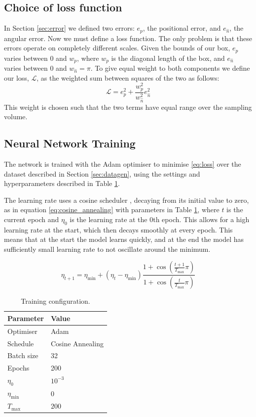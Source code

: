 \subsection{Choice of loss function}\label{sec:methods-loss}
In Section \ref{sec:error} we defined two errors: $e_p$, the positional error, and $e_{\hat{n}}$, the angular error. Now we must define a loss function. The only problem is that these errors operate on completely different scales. Given the bounds of our box, $e_p$ varies between $0$ and $w_p$, where $w_p$ is the diagonal length of the box, and $e_{\hat{n}}$ varies between $0$ and $w_{\hat{n}} = \pi$. To give equal weight to both components we define our loss, $\mathcal{L}$, as the weighted sum between squares of the two as follows: 
\begin{equation}
  \mathcal{L} = e_p^2 + \frac{w_p^2}{w_{\hat{n}}^2} e_{\hat{n}}^2
  \label{eq:loss}
\end{equation}
This weight is chosen such that the two terms have equal range over the sampling volume.
\subsection{Neural Network Training}\label{sec:nn_training}
The network is trained with the Adam optimiser \cite{kingma2017} to minimise \eqref{eq:loss} over the dataset described in Section \ref{sec:datagen}, using the settings and hyperparameters described in Table \ref{tab:training}.

The learning rate uses a cosine scheduler \cite{loshchilov2017}, decaying from its initial value to zero, as in equation \eqref{eq:cosine_annealing} with parameters in Table \ref{tab:training}, where $t$ is the current epoch and $\eta_0$ is the learning rate at the 0th epoch. This allows for a high learning rate at the start, which then decays smoothly at every epoch. This means that at the start the model learns quickly, and at the end the model has sufficiently small learning rate to not oscillate around the minimum. 

\begin{equation}
  \eta_{t+1} = \eta_{\mathrm{min}} + (\eta_t - \eta_{\mathrm{min}}) \frac{1 + \cos \left( \frac{t+1}{T_{\mathrm{max}}}\pi \right)}{1 + \cos \left( \frac{t}{T_\mathrm{max}} \pi \right)}
 \label{eq:cosine_annealing} 
\end{equation}
\begin{table}
  \centering
  \begin{tabular}{ll}
    \toprule
    Parameter & Value \\
    \midrule
    Optimiser       & Adam \\
    Schedule        & Cosine Annealing \\
    Batch size      & 32 \\
    Epochs          & 200 \\
    $\eta_{0}$ & $10^{-3}$ \\
    $\eta_{\mathrm{min}}$ & $0$ \\
    $T_{\max}$ & $200$ \\
    \bottomrule
  \end{tabular}
  \caption{Training configuration.}
  \label{tab:training}
\end{table}
